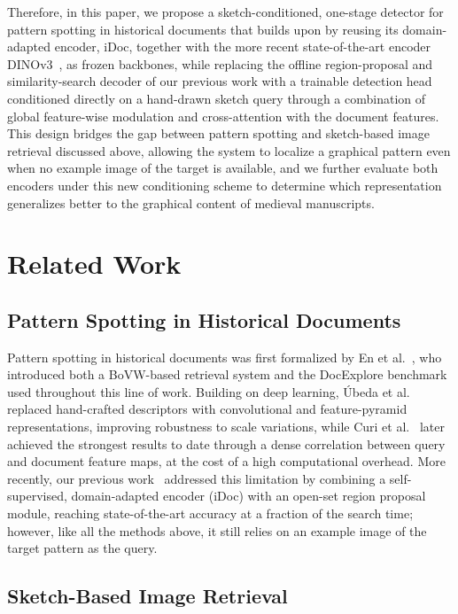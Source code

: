 \documentclass{iopjournal}
\begin{document}
Therefore, in this paper, we propose a sketch-conditioned, one-stage detector for pattern spotting in historical documents that builds upon \cite{saavedra2024idoc} by reusing its domain-adapted encoder, iDoc, together with the more recent state-of-the-art encoder DINOv3~\cite{dinov3}, as frozen backbones, while replacing the offline region-proposal and similarity-search decoder of our previous work with a trainable detection head conditioned directly on a hand-drawn sketch query through a combination of global feature-wise modulation and cross-attention with the document features. This design bridges the gap between pattern spotting and sketch-based image retrieval discussed above, allowing the system to localize a graphical pattern even when no example image of the target is available, and we further evaluate both encoders under this new conditioning scheme to determine which representation generalizes better to the graphical content of medieval manuscripts.

\section{Related Work}

\subsection{Pattern Spotting in Historical Documents}

Pattern spotting in historical documents was first formalized by En et al.~\cite{en2016scalable,en2017dataset}, who introduced both a BoVW-based retrieval system and the DocExplore benchmark used throughout this line of work. Building on deep learning, {\'U}beda et al.~\cite{ubeda2019convolutional,ubeda2020fpn} replaced hand-crafted descriptors with convolutional and feature-pyramid representations, improving robustness to scale variations, while Curi et al.~\cite{curi2022binary} later achieved the strongest results to date through a dense correlation between query and document feature maps, at the cost of a high computational overhead. More recently, our previous work~\cite{saavedra2024idoc} addressed this limitation by combining a self-supervised, domain-adapted encoder (iDoc) with an open-set region proposal module, reaching state-of-the-art accuracy at a fraction of the search time; however, like all the methods above, it still relies on an example image of the target pattern as the query.

\subsection{Sketch-Based Image Retrieval}
\end{document}
